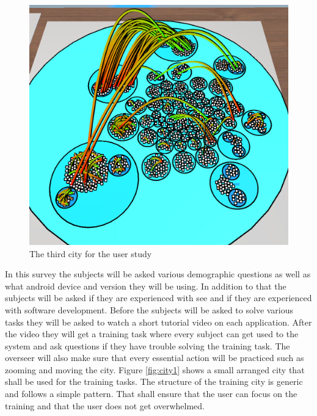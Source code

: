 \begin{figure}[htb]
  \centering
  \includegraphics[width=1\textwidth]{Evaluation/img/city_3.png}
  \caption{The third \gls{city} for the user study}\label{fig:city3}
\end{figure}
In this survey the subjects will be asked various demographic questions as well as what \gls{android} device and version they will be using.
In addition to that the subjects will be asked if they are experienced with \gls{see} and if they are experienced with software development.
Before the subjects will be asked to solve various tasks they will be asked to watch a short tutorial video on each application.
After the video they will get a training task where every subject can get used to the system and ask questions if they have trouble solving the training task.
The overseer will also make sure that every essential action will be practiced such as zooming and moving the \gls{city}.
Figure \ref{fig:city1} shows a small arranged \gls{city} that shall be used for the training tasks.
The structure of the training \gls{city} is generic and follows a simple pattern.
That shall ensure that the user can focus on the training and that the user does not get overwhelmed.

